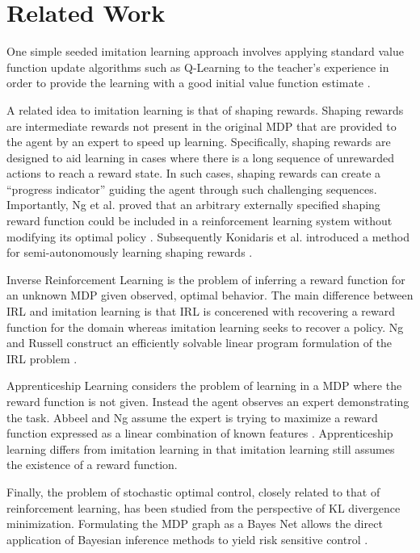 \documentclass{article} %
\begin{document}
\section{Related Work}
One simple seeded imitation learning approach involves applying standard value
function update algorithms such as Q-Learning to the teacher's experience in
order to provide the learning with a good initial value function estimate
\cite{whitehead91,price01}. 

A related idea to imitation learning is that of shaping rewards. Shaping
rewards are intermediate rewards not present in the original MDP that are
provided to the agent by an expert to speed up learning. Specifically, shaping
rewards are designed to aid learning in cases where there is a long sequence of
unrewarded actions to reach a reward state. In such cases, shaping rewards can
create a ``progress indicator'' guiding the agent through such challenging
sequences. Importantly, Ng et al. proved that an arbitrary externally specified
shaping reward function could be included in a reinforcement learning system
without modifying its optimal policy \cite{ng99}. Subsequently Konidaris et al.
introduced a method for semi-autonomously learning shaping rewards
\cite{konidaris06}.

Inverse Reinforcement Learning is the problem of inferring a reward function
for an unknown MDP given observed, optimal behavior. The main difference
between IRL and imitation learning is that IRL is concerened with recovering a
reward function for the domain whereas imitation learning seeks to recover a
policy. Ng and Russell construct an efficiently solvable linear program
formulation of the IRL problem \cite{ng00}. 

Apprenticeship Learning considers the problem of learning in a MDP where the
reward function is not given. Instead the agent observes an expert
demonstrating the task. Abbeel and Ng assume the expert is trying to maximize a
reward function expressed as a linear combination of known features
\cite{abbeel04}. Apprenticeship learning differs from imitation learning in
that imitation learning still assumes the existence of a reward function.

Finally, the problem of stochastic optimal control, closely related to that of
reinforcement learning, has been studied from the perspective of KL divergence
minimization. Formulating the MDP graph as a Bayes Net allows the direct
application of Bayesian inference methods to yield risk sensitive control
\cite{rawlik10,tousaint06}.
\end{document}
